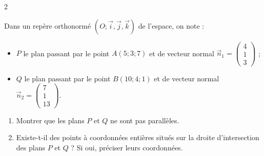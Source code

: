 \documentclass[a4paper,12pt]{article}
\begin{document}
\begin{multicols}{2}
    \begin{exercice}[title=Exercice 29 $\quad \star\star \quad$ { [Représenter, Raisonner] }]{}{}
    Dans un repère orthonormé $(O; \vec{i}, \vec{j}, \vec{k})$ de l'espace, on note :
    \begin{itemize}
        \item $P$ le plan passant par le point $A(5;3;7)$ et de vecteur normal $\vec{n}_1 = \begin{pmatrix} 4 \\ 1 \\ 3 \end{pmatrix}$ ;
        \item $Q$ le plan passant par le point $B(10;4;1)$ et de vecteur normal $\vec{n}_2 = \begin{pmatrix} 7 \\ 1 \\ 13 \end{pmatrix}$.
    \end{itemize}
    \begin{enumerate}
        \item Montrer que les plans $P$ et $Q$ ne sont pas parallèles.
        \item Existe-t-il des points à coordonnées entières situés sur la droite d'intersection des plans $P$ et $Q$ ? Si oui, préciser leurs coordonnées.
    \end{enumerate}
    \end{exercice}    


\end{multicols}
\end{document}

